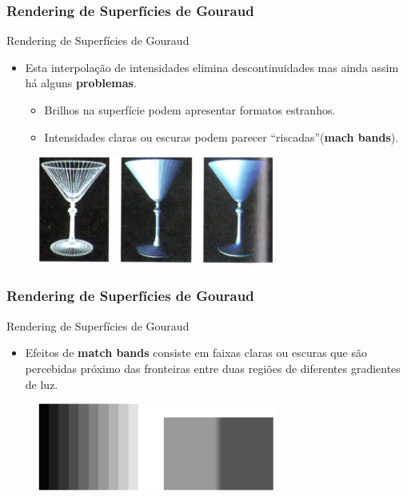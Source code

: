 \documentclass{beamer}
\begin{document}
\begin{frame}
\frametitle{Rendering de Superfícies de Gouraud}

		\begin{block}{Rendering de Superfícies de Gouraud}
		\begin{itemize}
			\item Esta interpolação de intensidades elimina descontinuidades mas ainda assim há alguns \textbf{problemas}.
			\begin{itemize}
				\item Brilhos na superfície podem apresentar formatos estranhos.
				\item Intensidades claras ou escuras podem parecer ``riscadas''(\textbf{mach bands}).
			\end{itemize}
			\end{itemize}
	\end{block}
	
	\begin{figure}[!h]
			\begin{center}
			\includegraphics[width=0.7\textwidth]{Figures/MatBan}
			\end{center}
		\end{figure}
\end{frame}


\begin{frame}
\frametitle{Rendering de Superfícies de Gouraud}

		\begin{block}{Rendering de Superfícies de Gouraud}
		\begin{itemize}
			\item Efeitos de \textbf{match bands} consiste em faixas claras ou escuras que são percebidas próximo das fronteiras entre duas regiões de diferentes gradientes de luz.
		\end{itemize}
	\end{block}
	
	\begin{figure}[!h]
			\begin{center}
			\includegraphics[width=0.7\textwidth]{Figures/graCor}
			\end{center}
		\end{figure}
\end{frame}
\end{document}
